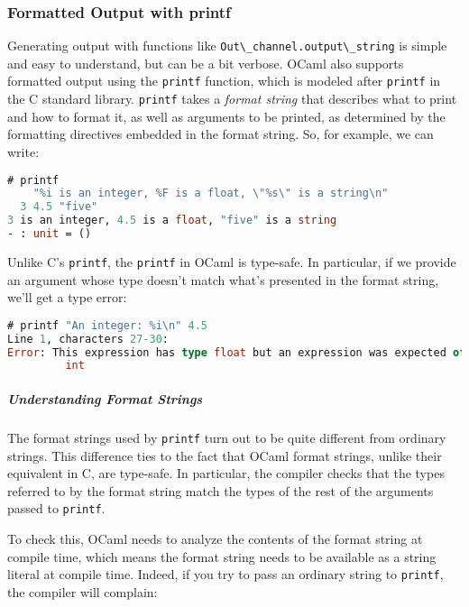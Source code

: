 \hypertarget{formatted-output-with-printf}{%
\subsubsection{Formatted Output with
printf}\label{formatted-output-with-printf}}

Generating output with functions like
\passthrough{\lstinline!Out\_channel.output\_string!} is simple and easy
to understand, but can be a bit verbose. OCaml also supports formatted
output using the \passthrough{\lstinline!printf!} function, which is
modeled after \passthrough{\lstinline!printf!} in the C standard
library. \passthrough{\lstinline!printf!} takes a \emph{format string}
that describes what to print and how to format it, as well as arguments
to be printed, as determined by the formatting directives embedded in
the format string. So, for example, we can write:

\begin{lstlisting}[language=Caml]
# printf
    "%i is an integer, %F is a float, \"%s\" is a string\n"
  3 4.5 "five"
3 is an integer, 4.5 is a float, "five" is a string
- : unit = ()
\end{lstlisting}

Unlike C's \passthrough{\lstinline!printf!}, the
\passthrough{\lstinline!printf!} in OCaml is type-safe. In particular,
if we provide an argument whose type doesn't match what's presented in
the format string, we'll get a type error:

\begin{lstlisting}[language=Caml]
# printf "An integer: %i\n" 4.5
Line 1, characters 27-30:
Error: This expression has type float but an expression was expected of type
         int
\end{lstlisting}

\hypertarget{understanding-format-strings}{%
\subparagraph{Understanding Format
Strings}\label{understanding-format-strings}}

The format strings used by \passthrough{\lstinline!printf!} turn out to
be quite different from ordinary strings. This difference ties to the
fact that OCaml format strings, unlike their equivalent in C, are
type-safe. In particular, the compiler checks that the types referred to
by the format string match the types of the rest of the arguments passed
to \passthrough{\lstinline!printf!}.

To check this, OCaml needs to analyze the contents of the format string
at compile time, which means the format string needs to be available as
a string literal at compile time. Indeed, if you try to pass an ordinary
string to \passthrough{\lstinline!printf!}, the compiler will complain:

